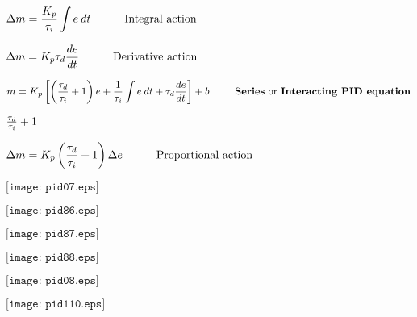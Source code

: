 \documentclass[12pt,a4paper,margin=2cm]{book}
\def\lthtmlcheckvsize{\ifdim\ht\sizebox<\vsize 
  \ifdim\wd\sizebox<\hsize\expandafter\hfill\fi \expandafter\vfill
  \else\expandafter\vss\fi}%
\begin{document}
{\newpage\clearpage
{}%
$\displaystyle \Delta m = {K_p \over \tau_i} \int e \> dt \hskip 30pt \hbox{Integral action}$%
\lthtmlindisplaymathZ
\lthtmlcheckvsize\clearpage}

{\newpage\clearpage
{}%
$\displaystyle \Delta m = K_p \tau_d {de \over dt} \hskip 30pt \hbox{Derivative action}$%
\lthtmlindisplaymathZ
\lthtmlcheckvsize\clearpage}

{\newpage\clearpage
{}%
$\displaystyle m = K_p \left[ \left({\tau_d \over \tau_i} + 1 \right) e + {1 \over \tau_i} \int e \> dt + \tau_d {de \over dt} \right] + b \hbox{\hskip 25pt \textbf{Series} or \textbf{Interacting PID equation}}$%
\lthtmlindisplaymathZ
\lthtmlcheckvsize\clearpage}

{\newpage\clearpage
{}%
$ {\tau_d \over \tau_i} + 1$%
\lthtmlindisplaymathZ
\lthtmlcheckvsize\clearpage}

{\newpage\clearpage
{}%
$\displaystyle \Delta m = K_p \left({\tau_d \over \tau_i} + 1\right) \Delta e \hskip 30pt \hbox{Proportional action}$%
\lthtmlindisplaymathZ
\lthtmlcheckvsize\clearpage}

{\newpage\clearpage
{}%
$\displaystyle \texttt{[image: pid07.eps]}$%
\lthtmlindisplaymathZ
\lthtmlcheckvsize\clearpage}

{\newpage\clearpage
{}%
$\displaystyle \texttt{[image: pid86.eps]}$%
\lthtmlindisplaymathZ
\lthtmlcheckvsize\clearpage}

{\newpage\clearpage
{}%
$\displaystyle \texttt{[image: pid87.eps]}$%
\lthtmlindisplaymathZ
\lthtmlcheckvsize\clearpage}

{\newpage\clearpage
{}%
$\displaystyle \texttt{[image: pid88.eps]}$%
\lthtmlindisplaymathZ
\lthtmlcheckvsize\clearpage}

{\newpage\clearpage
{}%
$\displaystyle \texttt{[image: pid08.eps]}$%
\lthtmlindisplaymathZ
\lthtmlcheckvsize\clearpage}

{\newpage\clearpage
{}%
$\displaystyle \texttt{[image: pid110.eps]}$%
\lthtmlindisplaymathZ
\lthtmlcheckvsize\clearpage}
\end{document}
